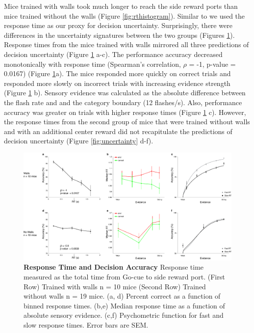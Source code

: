 Mice trained with walls took much longer to reach the side reward ports than mice trained without the walls (Figure \ref{fig:rthistogram}). Similar to \textcite{Urai2017} we used the response time as our proxy for decision uncertainty. Surprisingly, there were differences in the uncertainty signatures between the two groups (Figures \ref{fig:rtuncertainty}). Response times from the mice trained with walls mirrored all three predictions of decision uncertainty (Figure \ref{fig:rtuncertainty} a-c). The performance accuracy decreased monotonically with response time (Spearman's correlation, $\rho$ = -1, p-value = 0.0167) (Figure \ref{fig:rtuncertainty}a). The mice responded more quickly on correct trials and responded more slowly on incorrect trials with increasing evidence strength  (Figure \ref{fig:rtuncertainty} b). Sensory evidence was calculated as the absolute difference between the flash rate and and the category boundary (12 flashes/s). Also, performance accuracy was greater on trials with higher response times (Figure \ref{fig:rtuncertainty} c). However, the response times from the second group of mice that were trained without walls and with an additional center reward did not recapitulate the predictions of decision uncertainty (Figure \ref{fig:uncertainty} d-f). \par 
\begin{figure}
  \centering
  	\includegraphics[width=\textwidth]{Figures/chapter2/RTUncertaintySignatures.png}
  \caption[Response Time and Decision Accuracy]{\textbf{Response Time and Decision Accuracy} Response time measured as the total time from Go-cue to side reward port. (First Row) Trained with walls n = 10 mice (Second Row) Trained without walls n = 19 mice. (a, d) Percent correct as a function of binned response times. (b,e) Median response time as a function of absolute sensory evidence. (c,f) Psychometric function for fast and slow response times. Error bars are SEM.}
   \label{fig:rtuncertainty}
\end{figure}
